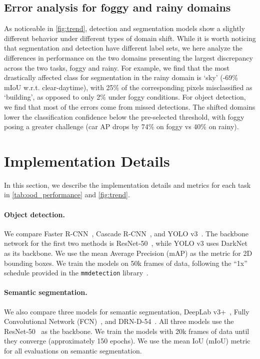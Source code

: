 \subsection{Error analysis for foggy and rainy domains} \label{sec:error}
As noticeable in \autoref{fig:trend}, detection and segmentation models show a slightly different behavior under different types of domain shift. While it is worth noticing that segmentation and detection have different label sets, we here analyze the differences in performance on the two domains presenting the largest discrepancy across the two tasks, \ie{} foggy and rainy. 
For example, we find that the most drastically affected class for segmentation in the rainy domain is `sky' (-69\% mIoU w.r.t. clear-daytime), with 25\% of the corresponding pixels misclassified as `building', as opposed to only 2\% under foggy conditions. 
For object detection, we find that most of the errors come from missed detections. The shifted domains lower the classification confidence below the pre-selected threshold, with foggy posing a greater challenge (car AP drops by 74\% on foggy vs 40\% on rainy).

\section{Implementation Details} \label{sec:implementation_details}
In this section, we describe the implementation details and metrics for each task in \autoref{tab:ood_performance} and \autoref{fig:trend}.

\paragraph{Object detection.} We compare Faster R-CNN~\cite{ren2015faster}, Cascade R-CNN~\cite{cai2018cascade}, and YOLO v3~\cite{redmon2018yolov3}. The backbone network for the first two methods is ResNet-50~\cite{he2016deep}, while YOLO v3 uses DarkNet~\cite{redmon2017yolo9000} as its backbone. We use the mean Average Precision (mAP) as the metric for 2D bounding boxes. We train the models on 50k frames of data, following the ``1x'' schedule provided in the \texttt{mmdetection} library~.

\paragraph{Semantic segmentation.} We also compare three models for semantic segmentation, DeepLab v3+~\cite{deeplabv3plus2018}, Fully Convolutional Network (FCN)~\cite{long2015fully}, and DRN-D-54~\cite{yu2017dilated}. All three models use the ResNet-50~\cite{he2016deep} as the backbone. We train the models with 20k frames of data until they converge (approximately 150 epochs). We use the mean IoU (mIoU) metric for all evaluations on semantic segmentation.


